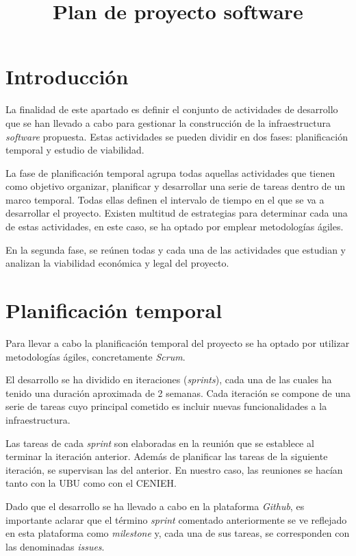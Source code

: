 \documentclass[
]{article}
\title{Plan de proyecto software}
\author{}
\date{}
\begin{document}
\maketitle

\hypertarget{introducciuxf3n}{%
\section{Introducción}\label{introducciuxf3n}}

La finalidad de este apartado es definir el conjunto de actividades de
desarrollo que se han llevado a cabo para gestionar la construcción de
la infraestructura \emph{software} propuesta. Estas actividades se
pueden dividir en dos fases: planificación temporal y estudio de
viabilidad.

La fase de planificación temporal agrupa todas aquellas actividades que
tienen como objetivo organizar, planificar y desarrollar una serie de
tareas dentro de un marco temporal. Todas ellas definen el intervalo de
tiempo en el que se va a desarrollar el proyecto. Existen multitud de
estrategias para determinar cada una de estas actividades, en este caso,
se ha optado por emplear metodologías ágiles.

En la segunda fase, se reúnen todas y cada una de las actividades que
estudian y analizan la viabilidad económica y legal del proyecto.

\hypertarget{planificaciuxf3n-temporal}{%
\section{Planificación temporal}\label{planificaciuxf3n-temporal}}

Para llevar a cabo la planificación temporal del proyecto se ha optado
por utilizar metodologías ágiles, concretamente \emph{Scrum}.

El desarrollo se ha dividido en iteraciones (\emph{sprints}), cada una
de las cuales ha tenido una duración aproximada de 2 semanas. Cada
iteración se compone de una serie de tareas cuyo principal cometido es
incluir nuevas funcionalidades a la infraestructura.

Las tareas de cada \emph{sprint} son elaboradas en la reunión que se
establece al terminar la iteración anterior. Además de planificar las
tareas de la siguiente iteración, se supervisan las del anterior. En
nuestro caso, las reuniones se hacían tanto con la UBU como con el
CENIEH.

Dado que el desarrollo se ha llevado a cabo en la plataforma
\emph{Github}, es importante aclarar que el término \emph{sprint}
comentado anteriormente se ve reflejado en esta plataforma como
\emph{milestone} y, cada una de sus tareas, se corresponden con las
denominadas \emph{issues}.
\end{document}
